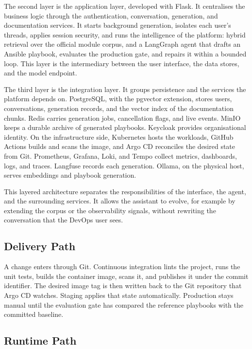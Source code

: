 The second layer is the application layer, developed with Flask. It centralises the business logic through the authentication, conversation, generation, and documentation services. It starts background generation, isolates each user's threads, applies session security, and runs the intelligence of the platform: hybrid retrieval over the official module corpus, and a LangGraph agent that drafts an Ansible playbook, evaluates the production gate, and repairs it within a bounded loop. This layer is the intermediary between the user interface, the data stores, and the model endpoint.

The third layer is the integration layer. It groups persistence and the services the platform depends on. PostgreSQL, with the pgvector extension, stores users, conversations, generation records, and the vector index of the documentation chunks. Redis carries generation jobs, cancellation flags, and live events. MinIO keeps a durable archive of generated playbooks. Keycloak provides organisational identity. On the infrastructure side, Kubernetes hosts the workloads, GitHub Actions builds and scans the image, and Argo CD reconciles the desired state from Git. Prometheus, Grafana, Loki, and Tempo collect metrics, dashboards, logs, and traces. Langfuse records each generation. Ollama, on the physical host, serves embeddings and playbook generation.

This layered architecture separates the responsibilities of the interface, the agent, and the surrounding services. It allows the assistant to evolve, for example by extending the corpus or the observability signals, without rewriting the conversation that the DevOps user sees.

\subsection{Delivery Path}

A change enters through Git. Continuous integration lints the project, runs the unit tests, builds the container image, scans it, and publishes it under the commit identifier. The desired image tag is then written back to the Git repository that Argo CD watches. Staging applies that state automatically. Production stays manual until the evaluation gate has compared the reference playbooks with the committed baseline.

\subsection{Runtime Path}

